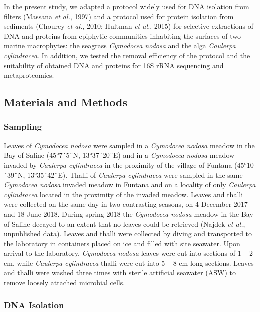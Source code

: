 \documentclass[12pt,]{article}
\begin{document}
In the present study, we adapted a protocol widely used for DNA
isolation from filters (Massana \emph{et al.}, 1997) and a protocol used
for protein isolation from sediments (Chourey \emph{et al.}, 2010;
Hultman \emph{et al.}, 2015) for selective extractions of DNA and
proteins from epiphytic communities inhabiting the surfaces of two
marine macrophytes: the seagrass \emph{Cymodocea nodosa} and the alga
\emph{Caulerpa cylindracea}. In addition, we tested the removal
efficiency of the protocol and the suitability of obtained DNA and
proteins for 16S rRNA sequencing and metaproteomics.

\newpage

\subsection{Materials and Methods}\label{materials-and-methods}

\subsubsection{Sampling}\label{sampling}

Leaves of \emph{Cymodocea nodosa} were sampled in a \emph{Cymodocea
nodosa} meadow in the Bay of Saline (45°7´5˝N, 13°37´20˝E) and in a
\emph{Cymodocea nodosa} meadow invaded by \emph{Caulerpa cylindracea} in
the proximity of the village of Funtana (45°10´39˝N, 13°35´42˝E). Thalli
of \emph{Caulerpa cylindracea} were sampled in the same \emph{Cymodocea
nodosa} invaded meadow in Funtana and on a locality of only
\emph{Caulerpa cylindracea} located in the proximity of the invaded
meadow. Leaves and thalli were collected on the same day in two
contrasting seasons, on 4 December 2017 and 18 June 2018. During spring
2018 the \emph{Cymodocea nodosa} meadow in the Bay of Saline decayed to
an extent that no leaves could be retrieved (Najdek \emph{et al.},
unpublished data). Leaves and thalli were collected by diving and
transported to the laboratory in containers placed on ice and filled
with site seawater. Upon arrival to the laboratory, \emph{Cymodocea
nodosa} leaves were cut into sections of 1 -- 2 \si{\cm}, while
\emph{Caulerpa cylindracea} thalli were cut into 5 -- 8 \si{\cm} long
sections. Leaves and thalli were washed three times with sterile
artificial seawater (ASW) to remove loosely attached microbial cells.

\subsubsection{DNA Isolation}\label{dna-isolation}
\end{document}
